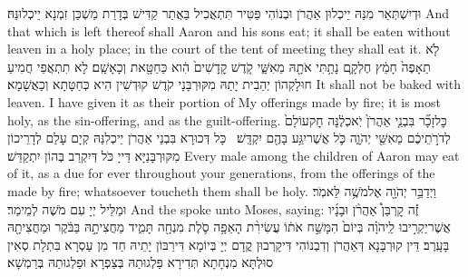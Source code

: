 {וּדְיִשְׁתְּאַר מִנַּהּ יֵיכְלוּן אַהֲרֹן וּבְנוֹהִי פַּטִּיר תִּתְאֲכִיל בַּאֲתַר קַדִּישׁ בְּדָרַת מַשְׁכַּן זִמְנָא יֵיכְלוּנַּהּ׃}
{And that which is left thereof shall Aaron and his sons eat; it shall be eaten without leaven in a holy place; in the court of the tent of meeting they shall eat it.}{}
{לֹ֤א תֵאָפֶה֙ חָמֵ֔ץ חֶלְקָ֛ם נָתַ֥תִּי אֹתָ֖הּ מֵאִשָּׁ֑י קֹ֤דֶשׁ קׇֽדָשִׁים֙ הִ֔וא כַּחַטָּ֖את וְכָאָשָֽׁם׃}
{לָא תִתְאֲפֵי חֲמִיעַ חוּלָקְהוֹן יְהַבִית יָתַהּ מִקּוּרְבָּנָי קֹדֶשׁ קוּדְשִׁין הִיא כְּחַטָּתָא וְכַאֲשָׁמָא׃}
{It shall not be baked with leaven. I have given it as their portion of My offerings made by fire; it is most holy, as the sin-offering, and as the guilt-offering.}{}
{כׇּל\maqqaf זָכָ֞ר בִּבְנֵ֤י אַהֲרֹן֙ יֹֽאכְלֶ֔נָּה חׇק\maqqaf עוֹלָם֙ לְדֹרֹ֣תֵיכֶ֔ם מֵאִשֵּׁ֖י יְהֹוָ֑ה כֹּ֛ל אֲשֶׁר\maqqaf יִגַּ֥ע בָּהֶ֖ם יִקְדָּֽשׁ׃ \petucha }
{כָּל דְּכוּרָא בִּבְנֵי אַהֲרֹן יֵיכְלִנַּהּ קְיָם עָלַם לְדָרֵיכוֹן מִקּוּרְבָּנַיָּא דַּייָ כֹּל דְּיִקְרַב בְּהוֹן יִתְקַדַּשׁ׃}
{Every male among the children of Aaron may eat of it, as a due for ever throughout your generations, from the offerings of the \lord\space made by fire; whatsoever toucheth them shall be holy.}{}
{וַיְדַבֵּ֥ר יְהֹוָ֖ה אֶל\maqqaf מֹשֶׁ֥ה לֵּאמֹֽר׃}
{וּמַלֵּיל יְיָ עִם מֹשֶׁה לְמֵימַר׃}
{And the \lord\space spoke unto Moses, saying:}{}
{זֶ֡ה קׇרְבַּן֩ אַהֲרֹ֨ן וּבָנָ֜יו אֲשֶׁר\maqqaf יַקְרִ֣יבוּ לַֽיהֹוָ֗ה בְּיוֹם֙ הִמָּשַׁ֣ח אֹת֔וֹ עֲשִׂירִ֨ת הָאֵפָ֥ה סֹ֛לֶת מִנְחָ֖ה תָּמִ֑יד מַחֲצִיתָ֣הּ בַּבֹּ֔קֶר וּמַחֲצִיתָ֖הּ בָּעָֽרֶב׃}
{דֵּין קוּרְבָּנָא דְּאַהֲרֹן וְדִבְנוֹהִי דִּיקָרְבוּן קֳדָם יְיָ בְּיוֹמָא דִּירַבּוֹן יָתֵיהּ חַד מִן עַסְרָא בִּתְלָת סְאִין סוּלְתָּא מִנְחָתָא תְּדִירָא פַּלְגוּתַהּ בְּצַפְרָא וּפַלְגוּתַהּ בְּרַמְשָׁא׃}
